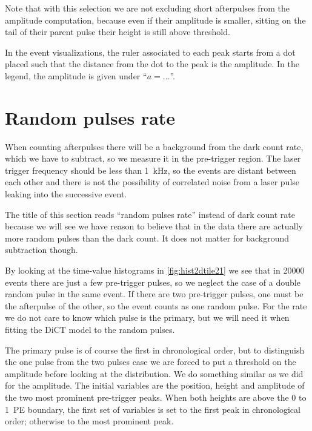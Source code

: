 Note that with this selection we are not excluding short afterpulses from the
amplitude computation, because even if their amplitude is smaller, sitting on
the tail of their parent pulse their height is still above threshold.

In the event visualizations, the ruler associated to each peak starts from a
dot placed such that the distance from the dot to the peak is the amplitude.
In the legend, the amplitude is given under ``$a = \ldots$''.

\section{Random pulses rate}
\label{sec:random}

When counting afterpulses there will be a background from the dark count rate,
which we have to subtract, so we measure it in the pre-trigger region. The
laser trigger frequency should be less than \SI{1}{kHz}, so the events are
distant between each other and there is not the possibility of correlated noise
from a laser pulse leaking into the successive event.


The title of this section reads ``random pulses rate'' instead of dark count
rate because we will see we have reason to believe that in the data there are
actually more random pulses than the dark count. It does not matter for
background subtraction though.

By looking at the time-value histograms in \autoref{fig:hist2dtile21} we see
that in \num{20000} events there are just a few pre-trigger pulses, so we
neglect the case of a double random pulse in the same event. If there are two
pre-trigger pulses, one must be the afterpulse of the other, so the event
counts as one random pulse. For the rate we do not care to know which pulse is
the primary, but we will need it when fitting the DiCT model to the random
pulses.

The primary pulse is of course the first in chronological order, but to
distinguish the one pulse from the two pulses case we are forced to put a
threshold on the amplitude before looking at the distribution. We do something
similar as we did for the amplitude. The initial variables are the position,
height and amplitude of the two most prominent pre-trigger peaks. When both
heights are above the 0 to 1~PE boundary, the first set of variables is set to
the first peak in chronological order; otherwise to the most prominent peak.

